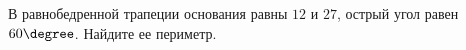 \begin{ex}
	\begin{condition}
		В равнобедренной трапеции основания равны \( 12  \) и \( 27 \), острый угол равен \( 60 \degree\). Найдите ее периметр.
	\end{condition}
\end{ex}